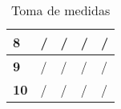 \documentclass[spanish,12pt,a4paper,titlepage]{report}
\begin{document}
\begin{table}[H]
\begin{center}
\begin{tabular}{|p{40pt}|p{80pt}|p{80pt}|p{80pt}|p{80pt}|}
\multicolumn{1}{|p{40pt}|}{\cellcolor[gray]{0.8}\textbf{8}} & \hspace*{40pt}/& \hspace*{40pt}/& \hspace*{40pt}/& \hspace*{40pt}/\\ \hline
\multicolumn{1}{|p{40pt}|}{\cellcolor[gray]{0.8}\textbf{9}} & \hspace*{40pt}/& \hspace*{40pt}/& \hspace*{40pt}/& \hspace*{40pt}/\\ \hline
\multicolumn{1}{|p{40pt}|}{\cellcolor[gray]{0.8}\textbf{10}} & \hspace*{40pt}/& \hspace*{40pt}/& \hspace*{40pt}/& \hspace*{40pt}/\\ \hline
\end{tabular} 
\caption{Toma de medidas}
\label{tab:I-medidas}
\end{center}
\end{table}
\end{document}
